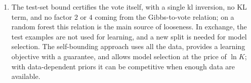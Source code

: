 \documentclass[11pt]{article}
\begin{document}
\begin{solution}
\begin{enumerate}
      $\frac{\partial p}{\partial q}=-\frac{F_q}{F_p}=\frac{p(1-p)}{p-q}\ln\frac{p(1-q)}{q(1-p)}$. For the first-order certificate
      $B(\rho)=2\,\klup(q(\rho),\varepsilon(\rho))$ with $q(\rho)=\rho^\top\widehat L$ and $\varepsilon(\rho)=\frac{\KL(\rho\|\pi)+c}n$,
      we have $\nabla_\rho q=\widehat L$ and $\nabla_\rho\varepsilon=\frac1n\big(\ln\frac\rho\pi+\mathbf1\big)$, so by the chain rule
      \[\nabla_\rho B=2\Big[\frac{\partial p}{\partial q}\,\widehat L+\frac{\partial p}{\partial\varepsilon}\,\frac1n\Big(\ln\frac\rho\pi+\mathbf 1\Big)\Big].\]
      (With a softmax parametrization $\rho=\mathrm{softmax}(\theta)$, multiply by the Jacobian: $\nabla_\theta B=\rho\odot(g-\rho^\top g)$.)
      Numerically, at $q=0.1$, $\varepsilon=0.05$, $p\approx0.220$: $\partial_\varepsilon p\approx1.43$ and $\partial_qp\approx1.33$.
\item The test-set bound certifies the vote itself, with a single kl inversion, no KL term, and no factor $2$ or $4$
      coming from the Gibbs-to-vote relation; on a random forest this relation is the main source of looseness. In
      exchange, the test examples are not used for learning, and a new split is needed for model selection. The
      self-bounding approach uses all the data, provides a learning objective with a guarantee, and allows model
      selection at the price of $\ln K$; with data-dependent priors it can be competitive when enough data are
      available.
\end{enumerate}
\end{solution}
\end{document}

